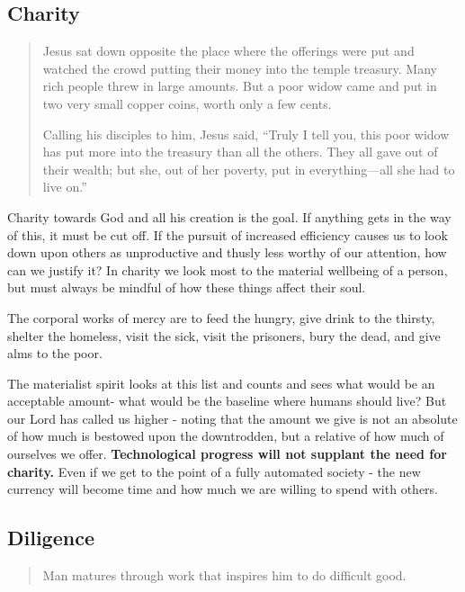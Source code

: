 \documentclass[letterpaper]{article}
\begin{document}
\subsection{Charity}

\begin{quote}
  Jesus sat down opposite the place where the offerings were put and watched the crowd putting their money into the temple treasury. Many rich people threw in large amounts. But a poor widow came and put in two very small copper coins, worth only a few cents.

  Calling his disciples to him, Jesus said, “Truly I tell you, this poor widow has put more into the treasury than all the others. They all gave out of their wealth; but she, out of her poverty, put in everything—all she had to live on.”
\end{quote}

Charity towards God and all his creation is the goal. If anything gets in the way of this, it must be cut off. If the pursuit of increased efficiency causes us to look down upon others as unproductive and thusly less worthy of our attention, how can we justify it? In charity we look most to the material wellbeing of a person, but must always be mindful of how these things affect their soul.

The corporal works of mercy are to feed the hungry, give drink to the thirsty, shelter the homeless, visit the sick, visit the prisoners, bury the dead, and give alms to the poor.

The materialist spirit looks at this list and counts and sees what would be an acceptable amount- what would be the baseline where humans should live? But our Lord has called us higher - noting that the amount we give is not an absolute of how much is bestowed upon the downtrodden, but a relative of how much of ourselves we offer. \textbf{Technological progress will not supplant the need for charity.} Even if we get to the point of a fully automated society - the new currency will become time and how much we are willing to spend with others.

\subsection{Diligence}

\begin{quote}
  Man matures through work that inspires him to do difficult good.
\end{quote}
\end{document}
